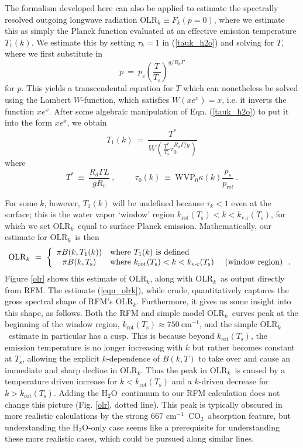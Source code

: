 \documentclass{ametsoc}
\newcommand{\beqn}{\begin{equation}}
\newcommand{\eeqn}{\end{equation}}
\newcommand{\beqnonum}{\begin{equation*}}
\newcommand{\eeqnonum}{\end{equation*}}
\newcommand{\n}{\nonumber}
\newcommand{\eqnref}[1]{(\ref{#1})}
\newcommand{\cminverse}{\ensuremath{\mathrm{cm^{-1}}}}
\newcommand{\Rd}{\ensuremath{R_d}}
\newcommand{\Rv}{\ensuremath{R_v}}
\newcommand{\Ts}{\ensuremath{T_\mathrm{s}}}
\newcommand{\ps}{\ensuremath{p_s}}
\newcommand{\cotwo}{\ensuremath{\mathrm{CO_2}}}
\newcommand{\htwo}{\ensuremath{\mathrm{H_2O}}}
\newcommand{\OLRk}{\ensuremath{\mathrm{OLR}_k}}
\newcommand{\tauk}{\ensuremath{\tau_k}}
\newcommand{\pref}{\ensuremath{p_{\mathrm{ref}}}}
\newcommand{\WVP}{\ensuremath{\mathrm{WVP}}}
\newcommand{\Tstar}{\ensuremath{T^*}}
\newcommand{\Tone}{\ensuremath{T_1}}
\newcommand{\krot}{\ensuremath{k_\mathrm{rot}}}
\newcommand{\kvr}{\ensuremath{k_\text{v-r}}}
\begin{document}
\appendix[B] \label{appendix_OLR}
The formalism developed here can also be applied to estimate the spectrally resolved outgoing longwave radiation $\OLRk \equiv F_k(p=0)$, where we estimate this as simply the Planck function evaluated at an effective emission temperature $\Tone(k)$. We estimate this by  setting $\tauk=1$ in  \eqnref{tauk_h2o} and solving for $T$, where we first substitute in
\beqn
	p \ =\ \ps\left(\frac{T}{\Ts}\right)^{g/\Rd\Gamma}  
	\n
\eeqn
for $p$. This yields a transcendental equation for $T$ which can nonetheless be solved using the Lambert $W$-function, which satisfies $W(xe^x) = x$, i.e. it inverts the function $xe^x$. After some algebraic manipulation of Eqn. \eqnref{tauk_h2o} to put it into the form $xe^x$, we obtain
\beqn
	\Tone(k)  \ = \ 	\frac{\Tstar}{W(\frac{\Tstar}{\Ts}\tau_0^{\Rd\Gamma/g})}
	\n
\eeqn
where 
\beqnonum
	\Tstar 	  \ \equiv \ \frac{\Rd \Gamma L}{g \Rv} \ , \hspace{1cm}  \tau_0(k)  \ \equiv \  \WVP_0\kappa(k)\frac{\ps}{\pref}  \ .
\eeqnonum

 For some $k$, however,  $T_1(k)$ will be undefined because $\tauk<1$ even at the surface; this is the water vapor `window' region $\krot(\Ts) < k < \kvr(\Ts)$, for which we set \OLRk\ equal to surface Planck emission.  Mathematically, our estimate for  \OLRk\ is then 
\beqn
	\OLRk \ =  \ \left\{ \begin{array}{cl} \pi B(k,T_1(k)) & \mbox{where $T_1(k)$ is defined} \\
														\pi B(k,\Ts) & \mbox{where $\krot(\Ts) < k < \kvr(\Ts)$ \quad (window region) \ .} 
								\end{array}						
					   \right .
	\label{eqn_olrk}
\eeqn
Figure \ref{olr} shows this estimate of \OLRk, along with \OLRk\ as output directly from RFM. The estimate \eqnref{eqn_olrk}, while crude, quantitatively captures the gross spectral shape of RFM's \OLRk. Furthermore, it gives us some insight into this shape, as follows. Both the RFM and simple model \OLRk\ curves peak at the beginning of the window region, $\krot(\Ts) \approx 750\ \cminverse$, and the simple  \OLRk\ estimate in particular has a cusp. This is because beyond $\krot(\Ts)$,   the emission temperature is no longer increasing with $k$ but rather becomes constant at \Ts,  allowing the explicit $k$-dependence of $B(k,T)$ to take over and cause an immediate and sharp decline in \OLRk. Thus the peak in \OLRk\ is caused by a temperature driven increase for $k<\krot(\Ts)$ and a $k$-driven decrease for $k>\krot(\Ts)$.  Adding the \htwo\ continuum to our RFM calculation does not change this picture (Fig. \ref{olr}, dotted line). This peak is typically obscured in more realistic calculations by the strong 667 \cminverse\ \cotwo\ absorption feature, but understanding the \htwo-only case seems like a prerequisite for understanding these more realistic cases, which could be pursued along similar lines.
\end{document}
